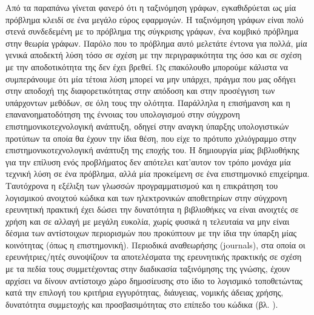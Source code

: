 Από τα παραπάνω γίνεται φανερό ότι η ταξινόμηση γράφων, εγκαθιδρύεται ως μία πρόβλημα κλειδί σε ένα μεγάλο εύρος εφαρμογών.
Η ταξινόμηση γράφων είναι πολύ στενά συνδεδεμένη με το πρόβλημα της σύγκρισης γράφων, ένα κομβικό πρόβλημα στην θεωρία γράφων.
Παρόλο που το πρόβλημα αυτό μελετάτε έντονα για πολλά, μία γενικά αποδεκτή λύση τόσο σε σχέση με την περιγραφικότητα της όσο και σε σχέση με την αποδοτικότητα της δεν έχει βρεθεί.
Ως επακόλουθο μπορούμε κάλιστα να συμπεράνουμε ότι μία τέτοια λύση μπορεί να μην υπάρχει, πράγμα που μας οδήγει στην αποδοχή της διαφορετικότητας στην απόδοση και στην προσέγγιση των υπάρχοντων μεθόδων, σε όλη τους την ολότητα.
Παράλληλα η επισήμανση και η επανανοηματοδότηση της έννοιας του υπολογισμού στην σύγχρονη επιστημονικοτεχνολογική ανάπτυξη, οδηγεί στην αναγκη ύπαρξης υπολογιστικών προτύπων τα οποία θα έχουν την ίδια θέση, που είχε το πρότυπο χιλιόγραμμο στην επιστημονικοτεχνολογική ανάπτυξη της εποχής του.
Η δημιουργία μίας βιβλιοθήκης για την επίλυση ενός προβλήματος δεν απότελει κατ'αυτον τον τρόπο μονάχα μία τεχνική λύση σε ένα πρόβλημα, αλλά μία προκείμενη σε ένα επιστημονικό επιχείρημα.
Ταυτόχρονα η εξέλιξη των γλωσσών προγραμματισμού και η επικράτηση του λογισμικού ανοιχτού κώδικα και των ηλεκτρονικών αποθετηρίων στην σύγχρονη ερευνητική πρακτική έχει δώσει την δυνατότητα η βιβλιοθήκες να είναι ανοιχτές σε χρήση και σε αλλαγή με μεγάλη ευκολία, χωρίς φυσικά η τελευταία να μην είναι δέσμια των αντίστοιχων περιορισμών που προκύπτουν με την ίδια την ύπαρξη μίας κοινότητας (όπως η επιστημονική).
Περιοδικά αναθεωρήσης (journals), στα οποία οι ερευνήτριες/ητές συνοψίζουν τα αποτελέσματα της ερευνητικής πρακτικής σε σχέση με τα πεδία τους συμμετέχοντας στην διαδικασία ταξινόμησης της γνώσης, έχουν αρχίσει να δίνουν αντίστοιχο χώρο δημοσίευσης στο ίδιο το λογισμικό τοποθετώντας κατά την επιλογή του κριτήρια εγγυρότητας, διάυγειας, νομικής άδειας χρήσης, δυνατότητα συμμετοχής και προσβασιμότητας στο επίπεδο του κώδικα (βλ. ).

